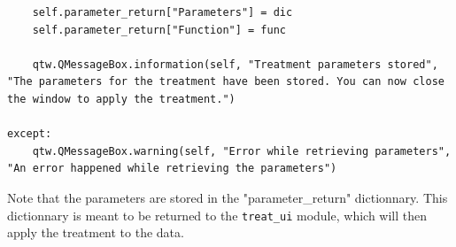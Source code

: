 \begin{enumerate}
\begin{lstlisting}
    self.parameter_return["Parameters"] = dic
    self.parameter_return["Function"] = func

    qtw.QMessageBox.information(self, "Treatment parameters stored", "The parameters for the treatment have been stored. You can now close the window to apply the treatment.")

except:
    qtw.QMessageBox.warning(self, "Error while retrieving parameters", "An error happened while retrieving the parameters")
\end{lstlisting}
    Note that the parameters are stored in the "parameter\_return" dictionnary. This dictionnary is meant to be returned to the \texttt{treat\_ui} module, which will then apply the treatment to the data.
\end{enumerate}